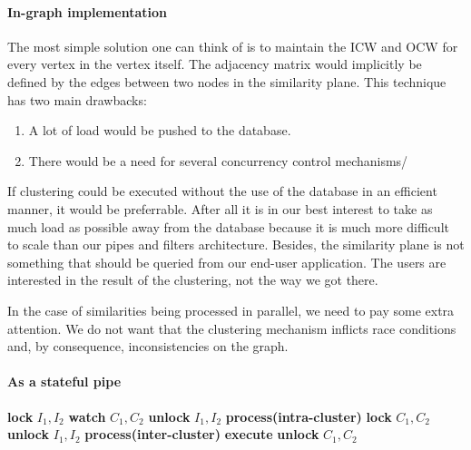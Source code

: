 \paragraph{In-graph implementation} The most simple solution one can think of is to maintain the ICW and OCW for every vertex in the vertex itself. The adjacency matrix would implicitly be defined by the edges between two nodes in the similarity plane. This technique has two main drawbacks:

\begin{enumerate}
\item A lot of load would be pushed to the database.
\item There would be a need for several concurrency control mechanisms/
\end{enumerate}

If clustering could be executed without the use of the database in an efficient manner, it would be preferrable. After all it is in our best interest to take as much load as possible away from the database because it is much more difficult to scale than our pipes and filters architecture. Besides, the similarity plane is not something that should be queried from our end-user application. The users are interested in the result of the clustering, not the way we got there.

In the case of similarities being processed in parallel, we need to pay some extra attention. We do not want that the clustering mechanism inflicts race conditions and, by consequence, inconsistencies on the graph.


\paragraph{As a stateful pipe}

\begin{algorithm}
\caption{!!!}
\label{mincutgusfield}
\begin{algorithmic}
\STATE \textbf{lock} $I_1,I_2$
  \STATE \textbf{watch} $C_1,C_2$
  \STATE \textbf{unlock} $I_1,I_2$
  \STATE \textbf{process(intra-cluster)}
\ELSE
  \STATE \textbf{lock} $C_1,C_2$
  \STATE \textbf{unlock} $I_1,I_2$
  \STATE \textbf{process(inter-cluster)}
  \STATE \textbf{execute}
  \STATE \textbf{unlock} $C_1,C_2$
\ENDIF
\end{algorithmic}
\end{algorithm}
